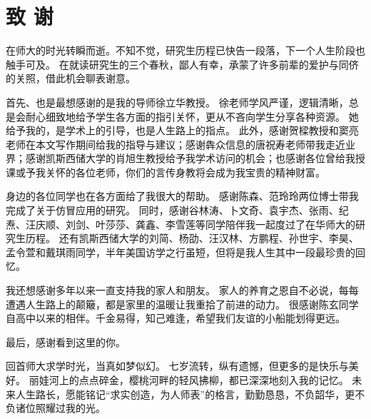 
\chapter*{致 \quad 谢}

在师大的时光转瞬而逝。不知不觉，研究生历程已快告一段落，下一个人生阶段也触手可及。
在就读研究生的三个春秋，鄙人有幸，承蒙了许多前辈的爱护与同侪的关照，借此机会聊表谢意。

首先、也是最想感谢的是我的导师徐立华教授。
徐老师学风严谨，逻辑清晰，总是会耐心细致地给予学生各方面的指引关怀，更从不吝向学生分享各种资源。
她给予我的，是学术上的引导，也是人生路上的指点。
此外，感谢贺樑教授和窦亮老师在本文写作期间给我的指导与建议；感谢犇众信息的唐祝寿老师带我走近业界；感谢凯斯西储大学的肖旭生教授给予我学术访问的机会；也感谢各位曾给我授课或予我关怀的各位老师，你们的言传身教将会成为我宝贵的精神财富。

身边的各位同学也在各方面给了我很大的帮助。
感谢陈森、范玲玲两位博士带我完成了关于仿冒应用的研究。
同时，感谢谷林涛、卜文奇、袁宇杰、张雨、纪焘、汪庆顺、刘剑、叶莎莎、龚鑫、李雪莲等同学陪伴我一起度过了在华师大的研究生历程。
还有凯斯西储大学的刘简、杨劭、汪汉林、方鹏程、孙世宇、李昊、孟令萱和戴琪雨同学，半年美国访学之行虽短，但将是我人生其中一段最珍贵的回忆。

我还想感谢多年以来一直支持我的家人和朋友。
家人的养育之恩自不必说，每每遭遇人生路上的颠簸，都是家里的温暖让我重拾了前进的动力。
很感谢陈玄同学自高中以来的相伴。千金易得，知己难逢，希望我们友谊的小船能划得更远。

最后，感谢看到这里的你。

回首师大求学时光，当真如梦似幻。
七岁流转，纵有遗憾，但更多的是快乐与美好。
丽娃河上的点点碎金，樱桃河畔的轻风拂柳，都已深深地刻入我的记忆。
未来人生路长，愿能铭记``求实创造，为人师表''的格言，勤勤恳恳，不负韶华，更不负诸位照耀过我的光。

